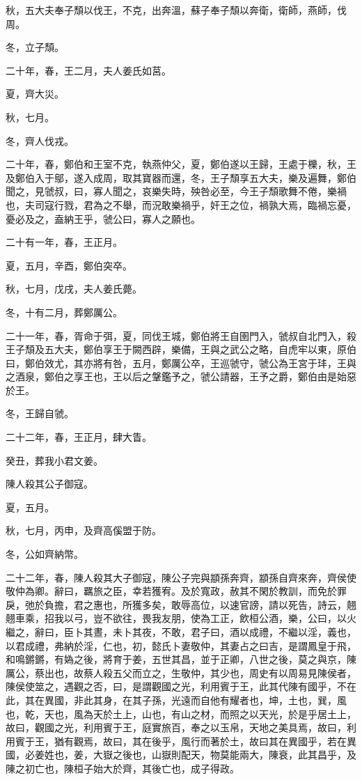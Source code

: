 \begin{pinyinscope}
秋，五大夫奉子頹以伐王，不克，出奔溫，蘇子奉子頹以奔衛，衛師，燕師，伐周。

冬，立子頹。

二十年，春，王二月，夫人姜氏如莒。

夏，齊大災。

秋，七月。

冬，齊人伐戎。

二十年，春，鄭伯和王室不克，執燕仲父，夏，鄭伯遂以王歸，王處于櫟，秋，王及鄭伯入于鄔，遂入成周，取其寶器而還，冬，王子頹享五大夫，樂及遍舞，鄭伯聞之，見虢叔，曰，寡人聞之，哀樂失時，殃咎必至，今王子頹歌舞不倦，樂禍也，夫司寇行戮，君為之不舉，而況敢樂禍乎，奸王之位，禍孰大焉，臨禍忘憂，憂必及之，盍納王乎，虢公曰，寡人之願也。

二十有一年，春，王正月。

夏，五月，辛酉，鄭伯突卒。

秋，七月，戊戌，夫人姜氏薨。

冬，十有二月，葬鄭厲公。

二十一年，春，胥命于弭，夏，同伐王城，鄭伯將王自圉門入，虢叔自北門入，殺王子頹及五大夫，鄭伯享王于闕西辟，樂備，王與之武公之略，自虎牢以東，原伯曰，鄭伯效尤，其亦將有咎，五月，鄭厲公卒，王巡虢守，虢公為王宮于玤，王與之酒泉，鄭伯之享王也，王以后之鞶鑑予之，虢公請器，王予之爵，鄭伯由是始惡於王。

冬，王歸自虢。

二十二年，春，王正月，肆大眚。

癸丑，葬我小君文姜。

陳人殺其公子御寇。

夏，五月。

秋，七月，丙申，及齊高傒盟于防。

冬，公如齊納幣。

二十二年，春，陳人殺其大子御寇，陳公子完與顓孫奔齊，顓孫自齊來奔，齊侯使敬仲為卿。辭曰，羈旅之臣，幸若獲宥。及於寬政，赦其不閑於教訓，而免於罪戾，弛於負擔，君之惠也，所獲多矣，敢辱高位，以速官謗，請以死告，詩云，翹翹車乘，招我以弓，豈不欲往，畏我友朋，使為工正，飲桓公酒，樂，公曰，以火繼之，辭曰，臣卜其晝，未卜其夜，不敢，君子曰，酒以成禮，不繼以淫，義也，以君成禮，弗納於淫，仁也，初，懿氏卜妻敬仲，其妻占之曰吉，是謂鳳皇于飛，和鳴鏘鏘，有媯之後，將育于姜，五世其昌，並于正卿，八世之後，莫之與京，陳厲公，蔡出也，故蔡人殺五父而立之，生敬仲，其少也，周史有以周易見陳侯者，陳侯使筮之，遇觀之否，曰，是謂觀國之光，利用賓于王，此其代陳有國乎，不在此，其在異國，非此其身，在其子孫，光遠而自他有耀者也，坤，土也，巽，風也，乾，天也，風為天於土上，山也，有山之材，而照之以天光，於是乎居土上，故曰，觀國之光，利用賓于王，庭實旅百，奉之以玉帛，天地之美具焉，故曰，利用賓于王，猶有觀焉，故曰，其在後乎，風行而著於土，故曰其在異國乎，若在異國，必姜姓也，姜，大嶽之後也，山嶽則配天，物莫能兩大，陳衰，此其昌乎，及陳之初亡也，陳桓子始大於齊，其後亡也，成子得政。


\end{pinyinscope}
